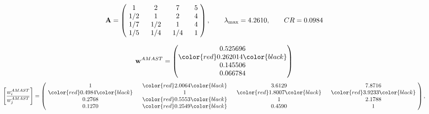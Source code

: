 \begin{example}
\begin{equation*}
\mathbf{A} =
\begin{pmatrix}
$\,\,$ 1 $\,\,$ & $\,\,$2$\,\,$ & $\,\,$7$\,\,$ & $\,\,$5 $\,\,$ \\
$\,\,$ 1/2$\,\,$ & $\,\,$ 1 $\,\,$ & $\,\,$2$\,\,$ & $\,\,$4 $\,\,$ \\
$\,\,$ 1/7$\,\,$ & $\,\,$ 1/2$\,\,$ & $\,\,$ 1 $\,\,$ & $\,\,$4 $\,\,$ \\
$\,\,$ 1/5$\,\,$ & $\,\,$ 1/4$\,\,$ & $\,\,$ 1/4$\,\,$ & $\,\,$ 1  $\,\,$ \\
\end{pmatrix},
\qquad
\lambda_{\max} =
4.2610,
\qquad
CR = 0.0984
\end{equation*}

\begin{equation*}
\mathbf{w}^{AMAST} =
\begin{pmatrix}
0.525696\\
\color{red} 0.262014\color{black} \\
0.145506\\
0.066784
\end{pmatrix}\end{equation*}
\begin{equation*}
\left[ \frac{{w}^{AMAST}_i}{{w}^{AMAST}_j} \right] =
\begin{pmatrix}
$\,\,$ 1 $\,\,$ & $\,\,$\color{red} 2.0064\color{black} $\,\,$ & $\,\,$3.6129$\,\,$ & $\,\,$7.8716$\,\,$ \\
$\,\,$\color{red} 0.4984\color{black} $\,\,$ & $\,\,$ 1 $\,\,$ & $\,\,$\color{red} 1.8007\color{black} $\,\,$ & $\,\,$\color{red} 3.9233\color{black}   $\,\,$ \\
$\,\,$0.2768$\,\,$ & $\,\,$\color{red} 0.5553\color{black} $\,\,$ & $\,\,$ 1 $\,\,$ & $\,\,$2.1788 $\,\,$ \\
$\,\,$0.1270$\,\,$ & $\,\,$\color{red} 0.2549\color{black} $\,\,$ & $\,\,$0.4590$\,\,$ & $\,\,$ 1  $\,\,$ \\
\end{pmatrix},
\end{equation*}


\end{example}
